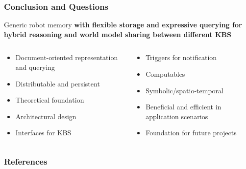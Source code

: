 \begin{frame}
  \frametitle{Conclusion and Questions}
  \begin{block}{Generic robot memory } \centering\bfseries
    with flexible storage and expressive querying for hybrid reasoning and world model sharing between different KBS
  \end{block}
  \bigskip
  \begin{columns}
    \begin{column}{0.5\textwidth}
      \begin{itemize}
      \item Document-oriented representation and querying
      \item Distributable and persistent
      \item Theoretical foundation
      \item Architectural design
      \item Interfaces for KBS
      \end{itemize}
    \end{column}
    \begin{column}{0.5\textwidth}
      \begin{itemize}
      \item Triggers for notification
      \item Computables
      \item Symbolic/spatio-temporal
      \item Beneficial and efficient in application scenarios
      \item Foundation for future projects
      \end{itemize}
    \end{column}
  \end{columns}
\end{frame}



\setcounter{finalframe}{\value{framenumber}}


\begin{frame}[allowframebreaks]
  \frametitle{References}
  \small
  
  
\end{frame}

